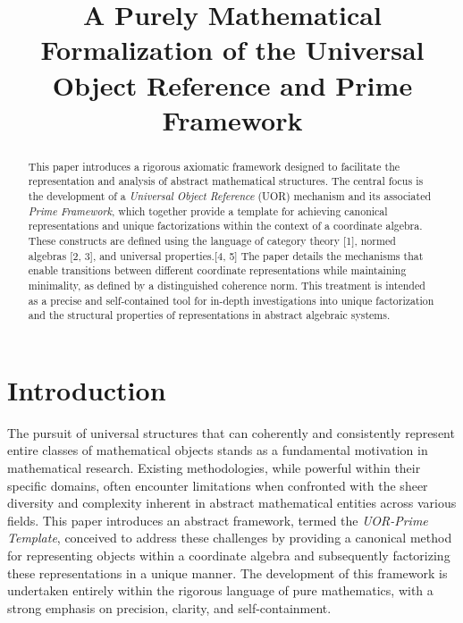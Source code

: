 \documentclass{article}
\title{A Purely Mathematical Formalization of the Universal Object Reference and Prime Framework}
\author{}
\date{}
\begin{document}
\maketitle

\begin{abstract}
This paper introduces a rigorous axiomatic framework designed to facilitate the representation and analysis of abstract mathematical structures. The central focus is the development of a \emph{Universal Object Reference} (UOR) mechanism and its associated \emph{Prime Framework}, which together provide a template for achieving canonical representations and unique factorizations within the context of a coordinate algebra. These constructs are defined using the language of category theory [1], normed algebras [2, 3], and universal properties.[4, 5] The paper details the mechanisms that enable transitions between different coordinate representations while maintaining minimality, as defined by a distinguished coherence norm. This treatment is intended as a precise and self-contained tool for in-depth investigations into unique factorization and the structural properties of representations in abstract algebraic systems.
\end{abstract}

\section{Introduction}

The pursuit of universal structures that can coherently and consistently represent entire classes of mathematical objects stands as a fundamental motivation in mathematical research. Existing methodologies, while powerful within their specific domains, often encounter limitations when confronted with the sheer diversity and complexity inherent in abstract mathematical entities across various fields. This paper introduces an abstract framework, termed the \emph{UOR-Prime Template}, conceived to address these challenges by providing a canonical method for representing objects within a coordinate algebra and subsequently factorizing these representations in a unique manner. The development of this framework is undertaken entirely within the rigorous language of pure mathematics, with a strong emphasis on precision, clarity, and self-containment.
\end{document}
